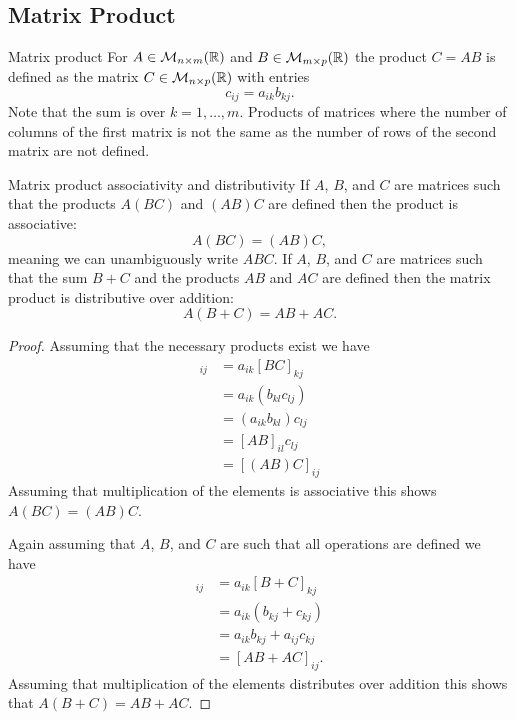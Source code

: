 \documentclass[a4paper]{article}
\newcommand{\nxmMatrices}[3]{\mathcal{M}_{{#1}\times{#2}}({#3})}
\begin{document}
    \subsection{Matrix Product}
    \begin{definition}{Matrix product}{}
        For \(A\in\nxmMatrices{n}{m}{\reals}\) and \(B\in\nxmMatrices{m}{p}{\reals}\) the product \(C = AB\) is defined as the matrix \(C\in\nxmMatrices{n}{p}{\reals}\) with entries
        \[c_{ij} = a_{ik}b_{kj}.\]
        Note that the sum is over \(k = 1, \dotsc, m\).
        Products of matrices where the number of columns of the first matrix is not the same as the number of rows of the second matrix are not defined.
    \end{definition}
    \begin{theorem}{Matrix product associativity and distributivity}{}
        If \(A\), \(B\), and \(C\) are matrices such that the products \(A(BC)\) and \((AB)C\) are defined then the product is associative:
        \[A(BC) = (AB)C,\]
        meaning we can unambiguously write \(ABC\).
        If \(A\), \(B\), and \(C\) are matrices such that the sum \(B + C\) and the products \(AB\) and \(AC\) are defined then the matrix product is distributive over addition:
        \[A(B + C) = AB + AC.\]
    \end{theorem}
    \begin{proof}
        Assuming that the necessary products exist we have
        \begin{align*}
            [A(BC)]_{ij} &= a_{ik}[BC]_{kj}\\
            &= a_{ik}(b_{kl}c_{lj})\\
            &= (a_{ik}b_{kl})c_{lj}\\
            &= [AB]_{il}c_{lj}\\
            &= [(AB)C]_{ij}
        \end{align*}
        Assuming that multiplication of the elements is associative this shows \(A(BC) = (AB)C\).
        
        Again assuming that \(A\), \(B\), and \(C\) are such that all operations are defined we have
        \begin{align*}
            [A(B + C)]_{ij} &= a_{ik}[B + C]_{kj}\\
            &= a_{ik}(b_{kj} + c_{kj})\\
            &= a_{ik}b_{kj} + a_{ij}c_{kj}\\
            &= [AB + AC]_{ij}.
        \end{align*}
        Assuming that multiplication of the elements distributes over addition this shows that \(A(B + C) = AB + AC\).
    \end{proof}
\end{document}
